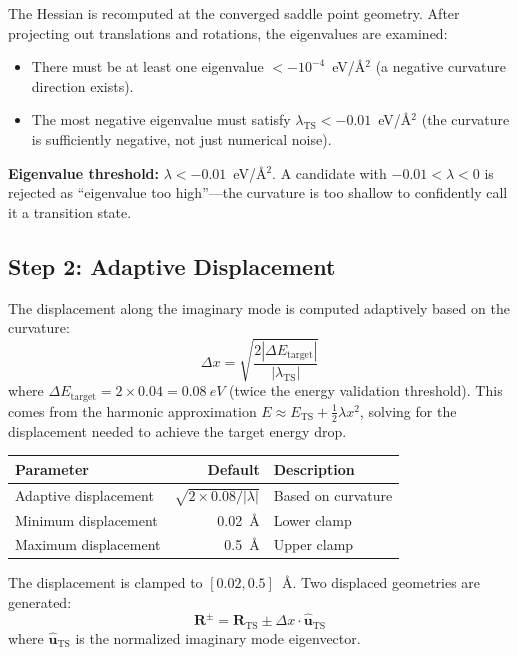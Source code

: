 \documentclass[11pt,a4paper]{article}
\begin{document}
The Hessian is recomputed at the converged saddle point geometry. After projecting out translations and rotations, the eigenvalues are examined:
\begin{itemize}
    \item There must be at least one eigenvalue $< -10^{-4}$~eV/\AA$^2$ (a negative curvature direction exists).
    \item The most negative eigenvalue must satisfy $\lambda_\text{TS} < -0.01$~eV/\AA$^2$ (the curvature is sufficiently negative, not just numerical noise).
\end{itemize}

\begin{threshbox}
\textbf{Eigenvalue threshold:} $\lambda < -0.01$~eV/\AA$^2$. A candidate with $-0.01 < \lambda < 0$ is rejected as ``eigenvalue too high''---the curvature is too shallow to confidently call it a transition state.
\end{threshbox}

\subsection{Step 2: Adaptive Displacement}

The displacement along the imaginary mode is computed adaptively based on the curvature:
\begin{equation}
    \Delta x = \sqrt{\frac{2 |\Delta E_\text{target}|}{|\lambda_\text{TS}|}}
\end{equation}
where $\Delta E_\text{target} = 2 \times 0.04 = \SI{0.08}{eV}$ (twice the energy validation threshold). This comes from the harmonic approximation $E \approx E_\text{TS} + \frac{1}{2}\lambda x^2$, solving for the displacement needed to achieve the target energy drop.

\begin{threshbox}
\begin{tabular}{lrl}
\toprule
Parameter & Default & Description \\
\midrule
Adaptive displacement & $\sqrt{2 \times 0.08 / |\lambda|}$ & Based on curvature \\
Minimum displacement & \SI{0.02}{\angstrom} & Lower clamp \\
Maximum displacement & \SI{0.5}{\angstrom} & Upper clamp \\
\bottomrule
\end{tabular}
\end{threshbox}

\noindent The displacement is clamped to $[0.02, 0.5]$~\AA. Two displaced geometries are generated:
\begin{equation}
    \mathbf{R}^\pm = \mathbf{R}_\text{TS} \pm \Delta x \cdot \hat{\mathbf{u}}_\text{TS}
\end{equation}
where $\hat{\mathbf{u}}_\text{TS}$ is the normalized imaginary mode eigenvector.
\end{document}
